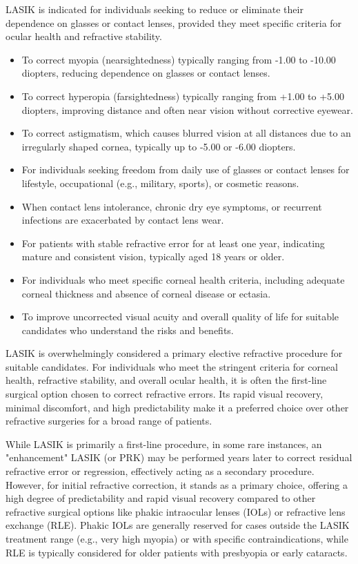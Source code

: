 LASIK is indicated for individuals seeking to reduce or eliminate their dependence on glasses or contact lenses, provided they meet specific criteria for ocular health and refractive stability.

\begin{itemize}
  \item To correct myopia (nearsightedness) typically ranging from -1.00 to -10.00 diopters, reducing dependence on glasses or contact lenses.
  \item To correct hyperopia (farsightedness) typically ranging from +1.00 to +5.00 diopters, improving distance and often near vision without corrective eyewear.
  \item To correct astigmatism, which causes blurred vision at all distances due to an irregularly shaped cornea, typically up to -5.00 or -6.00 diopters.
  \item For individuals seeking freedom from daily use of glasses or contact lenses for lifestyle, occupational (e.g., military, sports), or cosmetic reasons.
  \item When contact lens intolerance, chronic dry eye symptoms, or recurrent infections are exacerbated by contact lens wear.
  \item For patients with stable refractive error for at least one year, indicating mature and consistent vision, typically aged 18 years or older.
  \item For individuals who meet specific corneal health criteria, including adequate corneal thickness and absence of corneal disease or ectasia.
  \item To improve uncorrected visual acuity and overall quality of life for suitable candidates who understand the risks and benefits.
\end{itemize}

LASIK is overwhelmingly considered a primary elective refractive procedure for suitable candidates. For individuals who meet the stringent criteria for corneal health, refractive stability, and overall ocular health, it is often the first-line surgical option chosen to correct refractive errors. Its rapid visual recovery, minimal discomfort, and high predictability make it a preferred choice over other refractive surgeries for a broad range of patients.

While LASIK is primarily a first-line procedure, in some rare instances, an "enhancement" LASIK (or PRK) may be performed years later to correct residual refractive error or regression, effectively acting as a secondary procedure. However, for initial refractive correction, it stands as a primary choice, offering a high degree of predictability and rapid visual recovery compared to other refractive surgical options like phakic intraocular lenses (IOLs) or refractive lens exchange (RLE). Phakic IOLs are generally reserved for cases outside the LASIK treatment range (e.g., very high myopia) or with specific contraindications, while RLE is typically considered for older patients with presbyopia or early cataracts.

